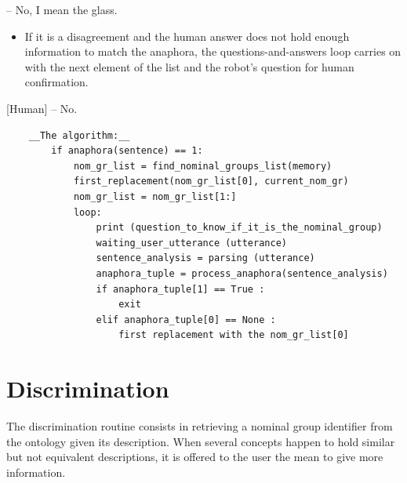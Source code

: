 \documentclass[twoside,a4paper,10pt]{report}
\begin{document}
\small
\begin{verbatimtab}
  [Human] – No, I mean the glass.
\end{verbatimtab}
\normalsize

\begin{itemize}
    \item  If it is a disagreement and the human answer does not hold enough information to match the anaphora, the questions-and-answers loop carries on with the next element of the list and the robot’s question for human confirmation.
\end{itemize}

    [Human] – No.


\lstset{language=python}
\begin{lstlisting}
	__The algorithm:__
		if anaphora(sentence) == 1:
			nom_gr_list = find_nominal_groups_list(memory)
			first_replacement(nom_gr_list[0], current_nom_gr)
			nom_gr_list = nom_gr_list[1:]
			loop:
				print (question_to_know_if_it_is_the_nominal_group)
				waiting_user_utterance (utterance)
				sentence_analysis = parsing (utterance)
				anaphora_tuple = process_anaphora(sentence_analysis)
				if anaphora_tuple[1] == True :
					exit
				elif anaphora_tuple[0] == None :
					first replacement with the nom_gr_list[0]

\end{lstlisting}

\section{Discrimination}
\label{974418acf6ac4871b739b9591436865a}%

The discrimination routine consists in retrieving a nominal group identifier from the ontology given its description. 
When several concepts happen to hold similar but not equivalent descriptions, it is offered to the user the mean to give more information.
\end{document}
